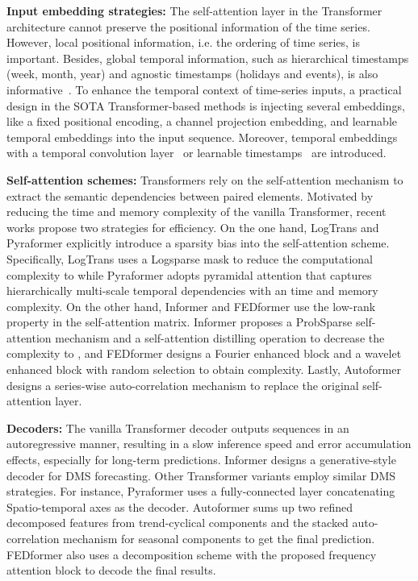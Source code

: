 \documentclass[10pt,twocolumn,letterpaper]{article}
\begin{document}
\noindent\textbf{Input embedding strategies:}
The self-attention layer in the Transformer architecture cannot preserve the positional information of the time series. However, local positional information, i.e. the ordering of time series, is important. Besides, global temporal information, such as hierarchical timestamps (week, month, year) and agnostic timestamps (holidays and events), is also informative~\cite{informer}.
To enhance the temporal context of time-series inputs, a practical design in the SOTA Transformer-based methods is injecting several embeddings, like a fixed positional encoding, a channel projection embedding, and learnable temporal embeddings into the input sequence. Moreover, temporal embeddings with a temporal convolution layer~\cite{li2019LogTrans} or learnable timestamps~\cite{xu2021autoformer} are introduced. 


\noindent\textbf{Self-attention schemes:}
Transformers rely on the self-attention mechanism to extract the semantic dependencies between paired elements.
Motivated by reducing the  time and memory complexity of the vanilla Transformer, recent works propose two strategies for efficiency. On the one hand, LogTrans and Pyraformer explicitly introduce a sparsity bias into the self-attention scheme. Specifically, LogTrans uses a Logsparse mask to reduce the computational complexity to  while Pyraformer adopts pyramidal attention that captures hierarchically multi-scale temporal dependencies with an  time and memory complexity. On the other hand, Informer and FEDformer use the low-rank property in the self-attention matrix. Informer proposes a ProbSparse self-attention mechanism and a self-attention distilling operation to decrease the complexity to , and FEDformer designs a Fourier enhanced block and a wavelet enhanced block with random 
selection to obtain  complexity. Lastly, Autoformer designs a series-wise auto-correlation mechanism to replace the original self-attention layer.


\noindent\textbf{Decoders:}
The vanilla Transformer decoder outputs sequences in an autoregressive manner, resulting in a slow inference speed and error accumulation effects, especially for long-term predictions.
Informer designs a generative-style decoder for DMS forecasting. Other Transformer variants employ similar DMS strategies. 
For instance, Pyraformer uses a fully-connected layer concatenating Spatio-temporal axes as the decoder.
Autoformer sums up two refined decomposed features from trend-cyclical components and the stacked auto-correlation mechanism for seasonal components to get the final prediction. FEDformer also uses a decomposition scheme with the proposed frequency attention block to decode the final results.
\end{document}
